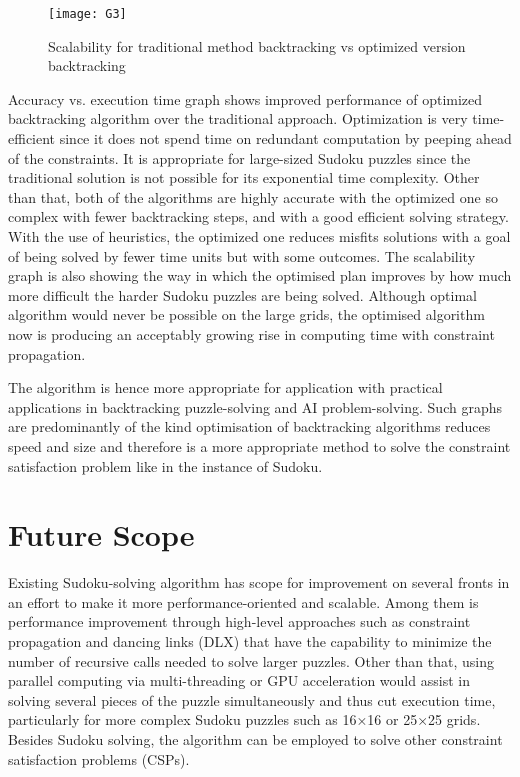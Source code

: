 \documentclass[conference]{IEEEtran}
\begin{document}
\begin{figure}[H]
    \centering
    \texttt{[image: G3]} 
    \caption{Scalability for traditional method backtracking vs optimized version backtracking}
    \label{fig:g3}
\end{figure}

Accuracy vs. execution time graph shows improved performance of optimized backtracking algorithm over the traditional approach. Optimization is very time-efficient since it does not spend time on redundant computation by peeping ahead of the constraints. It is appropriate for large-sized Sudoku puzzles since the traditional solution is not possible for its exponential time complexity. Other than that, both of the algorithms are highly accurate with the optimized one so complex with fewer backtracking steps, and with a good efficient solving strategy. With the use of heuristics, the optimized one reduces misfits solutions with a goal of being solved by fewer time units but with some outcomes. The scalability graph is also showing the way in which the optimised plan improves by how much more difficult the harder Sudoku puzzles are being solved. Although optimal algorithm would never be possible on the large grids, the optimised algorithm now is producing an acceptably growing rise in computing time with constraint propagation.

The algorithm is hence more appropriate for application with practical applications in backtracking puzzle-solving and AI problem-solving. Such graphs are predominantly of the kind optimisation of backtracking algorithms reduces speed and size and therefore is a more appropriate method to solve the constraint satisfaction problem like in the instance of Sudoku.

\section{Future Scope}
Existing Sudoku-solving algorithm has scope for improvement on several fronts in an effort to make it more performance-oriented and scalable. Among them is performance improvement through high-level approaches such as constraint propagation and dancing links (DLX) that have the capability to minimize the number of recursive calls needed to solve larger puzzles. Other than that, using parallel computing via multi-threading or GPU acceleration would assist in solving several pieces of the puzzle simultaneously and thus cut execution time, particularly for more complex Sudoku puzzles such as 16×16 or 25×25 grids. Besides Sudoku solving, the algorithm can be employed to solve other constraint satisfaction problems (CSPs).
\end{document}

